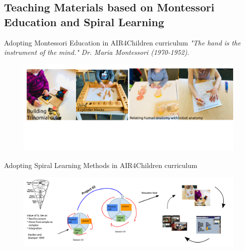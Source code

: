 \subsection{Teaching Materials based on Montessori Education and Spiral Learning}

{
\begin{frame}{Adopting Montessori Education in AIR4Children curriculum} 
  \vspace{3mm}
  \it{"The hand is the instrument of the mind."} Dr. Maria Montessori (1970-1952).
  \vspace{2mm}
    \begin{figure}
        \centering
        \includegraphics[width=1.0\textwidth]{./figures/montessori/versions/drawing-v00.png}
      \end{figure}
\end{frame}
}

{
\begin{frame}{Adopting Spiral Learning Methods in AIR4Children curriculum}

  \begin{figure}
        \centering
        \includegraphics[width=1.0\textwidth]{./figures/teaching-materials/versions/drawing-v02.png}
      \end{figure}
\end{frame}
}
